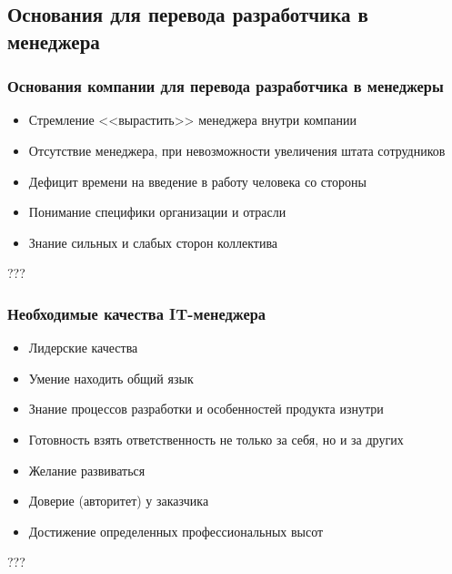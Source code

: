 \documentclass{../industrial-development}
\begin{document}
\subsection{Основания для перевода разработчика в менеджера}
\begin{frame} \frametitle{Основания компании для перевода разработчика в менеджеры}
\begin{itemize}
		\item Стремление <<вырастить>> менеджера внутри компании		
		\item Отсутствие менеджера, при невозможности увеличения штата сотрудников
		\item Дефицит времени на введение в работу человека со стороны	
		\item Понимание специфики организации и отрасли
		\item Знание сильных и слабых сторон коллектива
	\end{itemize}
\end{frame}
\lecturenotes
???
~\cite{How_to_be_a_good_IT-manager}

\begin{frame} \frametitle{Необходимые качества IT-менеджера}
\begin{itemize}
		\item Лидерские качества
		\item Умение находить общий язык
		\item Знание процессов разработки и особенностей продукта изнутри
		\item Готовность взять ответственность не только за себя, но и за других
		\item Желание развиваться
		\item Доверие (авторитет) у заказчика
		\item Достижение определенных профессиональных высот

	\end{itemize}
\end{frame}
\lecturenotes
???
~\cite{How_to_be_a_good_IT-manager}
\end{document}

